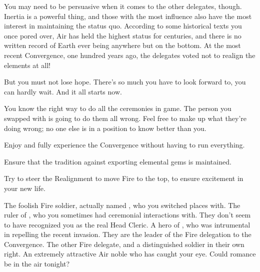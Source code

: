 \documentclass[char]{iron}
\begin{document}
You may need to be persuasive when it comes to the other delegates, though. Inertia is a powerful thing, and those with the most influence also have the most interest in maintaining the status quo. According to some historical texts you once pored over, Air has held the highest status for centuries, and there is no written record of Earth ever being anywhere but on the bottom. At the most recent Convergence, one hundred years ago, the delegates voted not to realign the elements at all!

But you must not lose hope. There's so much you have to look forward to, you can hardly wait.  And it all starts now.

\begin{itemz}[Notes]
\item You know the right way to do all the ceremonies in game.  The person
  you swapped with is going to do them all wrong.  Feel free to make
  up what they're doing wrong; no one else is in a position to know better
  than you.
\end{itemz}

\begin{itemz}[Goals]
\item Enjoy and fully experience the Convergence without having to run
  everything.
\item Ensure that the tradition against exporting elemental gems is maintained.
\item Try to steer the Realignment to move Fire to the top, to ensure excitement
  in your new life.
\end{itemz}

\begin{contacts}
\contact{\cFakePriest{}} The foolish Fire soldier, actually named
\cFakePriest{\real{\full}}, who you switched places with.
\contact{\cRoyalty{}} The ruler of \sHomeCountry{}, who you sometimes had
ceremonial interactions with. They don't seem to have recognized you as the real Head Cleric.
\contact{\cMulan{}} A hero of \sHomeCountry{}, who was intrumental in repelling the recent \sMulanCountryAdj{} invasion. They are the leader of the Fire delegation to the Convergence.
\contact{\cLieutenant{}} The other Fire delegate, and a distinguished soldier in their own right.
\contact{\cHotPerson{}} An extremely attractive Air noble who has caught your eye. Could romance be in the air tonight?
\end{contacts}
\end{document}
